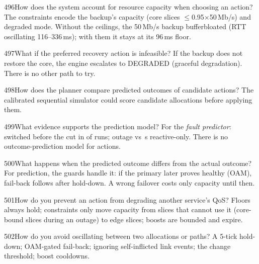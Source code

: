 \begin{qa}{496}{How does the system account for resource capacity when choosing an action?}
The constraints encode the backup's capacity (core slices $\le$0.95$\times$50\,Mb/s) and degraded mode. Without the
ceilings, the 50\,Mb/s backup bufferbloated (RTT oscillating 116--336\,ms); with them it stays at its 96\,ms floor.
\end{qa}

\begin{qa}{497}{What if the preferred recovery action is infeasible?}
If the backup does not restore the core, the engine escalates to \textsf{DEGRADED} (graceful degradation). There is
no other path to try.
\end{qa}

\begin{qa}{498}{How does the planner compare predicted outcomes of candidate actions?}
The calibrated sequential simulator could score candidate allocations before applying them.
\end{qa}

\begin{qa}{499}{What evidence supports the prediction model?}
For the \emph{fault predictor}: switched before the cut in \NDegBeforeCutShare{} of runs; outage \NOutDegFullMean{} vs
\NOutDegReactiveMean\,s reactive-only. There is no outcome-prediction model for actions.
\end{qa}

\begin{qa}{500}{What happens when the predicted outcome differs from the actual outcome?}
For prediction, the guards handle it: if the primary later proves healthy (OAM), fail-back follows after hold-down.
A wrong failover costs only capacity until then.
\end{qa}

\begin{qa}{501}{How do you prevent an action from degrading another service's QoS?}
Floors always hold; constraints only move capacity from slices that cannot use it (core-bound slices during an outage)
to edge slices; boosts are bounded and expire.
\end{qa}

\begin{qa}{502}{How do you avoid oscillating between two allocations or paths?}
A 5-tick hold-down; OAM-gated fail-back; ignoring self-inflicted link events; the change threshold; boost cooldowns.
\end{qa}

